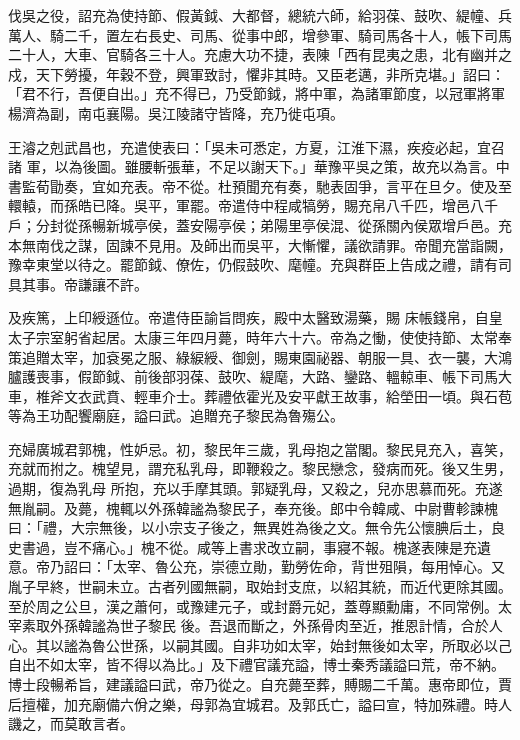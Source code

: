 \begin{pinyinscope}
 伐吳之役，詔充為使持節、假黃鉞、大都督，總統六師，給羽葆、鼓吹、緹幢、兵萬人、騎二千，置左右長史、司馬、從事中郎，增參軍、騎司馬各十人，帳下司馬二十人，大車、官騎各三十人。充慮大功不捷，表陳「西有昆夷之患，北有幽并之戍，天下勞擾，年穀不登，興軍致討，懼非其時。又臣老邁，非所克堪。」詔曰：「君不行，吾便自出。」充不得已，乃受節鉞，將中軍，為諸軍節度，以冠軍將軍楊濟為副，南屯襄陽。吳江陵諸守皆降，充乃徙屯項。



 王濬之剋武昌也，充遣使表曰：「吳未可悉定，方夏，江淮下濕，疾疫必起，宜召諸
 軍，以為後圖。雖腰斬張華，不足以謝天下。」華豫平吳之策，故充以為言。中書監荀勖奏，宜如充表。帝不從。杜預聞充有奏，馳表固爭，言平在旦夕。使及至轘轅，而孫皓已降。吳平，軍罷。帝遣侍中程咸犒勞，賜充帛八千匹，增邑八千戶；分封從孫暢新城亭侯，蓋安陽亭侯；弟陽里亭侯混、從孫關內侯眾增戶邑。充本無南伐之謀，固諫不見用。及師出而吳平，大慚懼，議欲請罪。帝聞充當詣闕，豫幸東堂以待之。罷節鉞、僚佐，仍假鼓吹、麾幢。充與群臣上告成之禮，請有司具其事。帝謙讓不許。



 及疾篤，上印綬遜位。帝遣侍臣諭旨問疾，殿中太醫致湯藥，賜
 床帳錢帛，自皇太子宗室躬省起居。太康三年四月薨，時年六十六。帝為之慟，使使持節、太常奉策追贈太宰，加袞冕之服、綠綟綬、御劍，賜東園祕器、朝服一具、衣一襲，大鴻臚護喪事，假節鉞、前後部羽葆、鼓吹、緹麾，大路、鑾路、轀輬車、帳下司馬大車，椎斧文衣武賁、輕車介士。葬禮依霍光及安平獻王故事，給塋田一頃。與石苞等為王功配饗廟庭，謚曰武。追贈充子黎民為魯殤公。



 充婦廣城君郭槐，性妒忌。初，黎民年三歲，乳母抱之當閣。黎民見充入，喜笑，充就而拊之。槐望見，謂充私乳母，即鞭殺之。黎民戀念，發病而死。後又生男，過期，復為乳母
 所抱，充以手摩其頭。郭疑乳母，又殺之，兒亦思慕而死。充遂無胤嗣。及薨，槐輒以外孫韓謐為黎民子，奉充後。郎中令韓咸、中尉曹軫諫槐曰：「禮，大宗無後，以小宗支子後之，無異姓為後之文。無令先公懷腆后土，良史書過，豈不痛心。」槐不從。咸等上書求改立嗣，事寢不報。槐遂表陳是充遺意。帝乃詔曰：「太宰、魯公充，崇德立勛，勤勞佐命，背世殂隕，每用悼心。又胤子早終，世嗣未立。古者列國無嗣，取始封支庶，以紹其統，而近代更除其國。至於周之公旦，漢之蕭何，或豫建元子，或封爵元妃，蓋尊顯勳庸，不同常例。太宰素取外孫韓謐為世子黎民
 後。吾退而斷之，外孫骨肉至近，推恩計情，合於人心。其以謐為魯公世孫，以嗣其國。自非功如太宰，始封無後如太宰，所取必以己自出不如太宰，皆不得以為比。」及下禮官議充謚，博士秦秀議謚曰荒，帝不納。博士段暢希旨，建議謚曰武，帝乃從之。自充薨至葬，賻賜二千萬。惠帝即位，賈后擅權，加充廟備六佾之樂，母郭為宜城君。及郭氏亡，謚曰宣，特加殊禮。時人譏之，而莫敢言者。




\end{pinyinscope}
